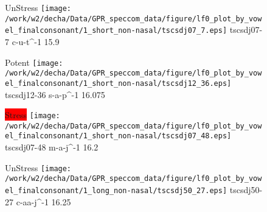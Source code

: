 \documentclass{article}
\begin{document}
\begin{figure}[t]
\begin{minipage}[b]{.24\textwidth}
UnStress
\centering
\texttt{[image: /work/w2/decha/Data/GPR\_speccom\_data/figure/lf0\_plot\_by\_vowel\_finalconsonant/1\_short\_non-nasal/tscsdj07\_7.eps]}
tscsdj07-7 c-u-t\textasciicircum-1 15.9
\end{minipage}
\begin{minipage}[b]{.24\textwidth}
\colorbox{Apricot}{Potent}
\centering
\texttt{[image: /work/w2/decha/Data/GPR\_speccom\_data/figure/lf0\_plot\_by\_vowel\_finalconsonant/1\_short\_non-nasal/tscsdj12\_36.eps]}
tscsdj12-36 s-a-p\textasciicircum-1 16.075
\end{minipage}
\begin{minipage}[b]{.24\textwidth}
\colorbox{red}{Stress}
\centering
\texttt{[image: /work/w2/decha/Data/GPR\_speccom\_data/figure/lf0\_plot\_by\_vowel\_finalconsonant/1\_short\_non-nasal/tscsdj07\_48.eps]}
tscsdj07-48 m-a-j\textasciicircum-1 16.2
\end{minipage}
\begin{minipage}[b]{.24\textwidth}
UnStress
\centering
\texttt{[image: /work/w2/decha/Data/GPR\_speccom\_data/figure/lf0\_plot\_by\_vowel\_finalconsonant/1\_long\_non-nasal/tscsdj50\_27.eps]}
tscsdj50-27 c-aa-j\textasciicircum-1 16.25
\end{minipage}
\end{figure}
\end{document}
